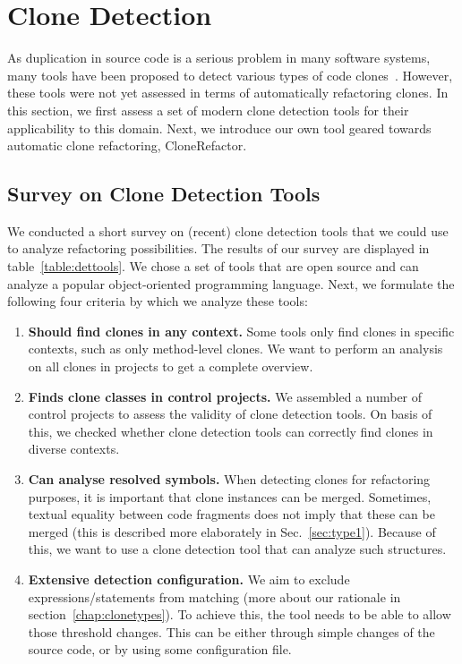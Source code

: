 \documentclass[a4paper]{article}
\begin{document}
\section{Clone Detection}\label{chap:clonedetection}
As duplication in source code is a serious problem in many software systems, many tools have been proposed to detect various types of code clones~\cite{sheneamer2016survey, svajlenko2014evaluating}. However, these tools were not yet assessed in terms of automatically refactoring clones. In this section, we first assess a set of modern clone detection tools for their applicability to this domain. Next, we introduce our own tool geared towards automatic clone refactoring, CloneRefactor.%

\subsection{Survey on Clone Detection Tools}
\label{ch:tool-overview}
We conducted a short survey on (recent) clone detection tools that we could use to analyze refactoring possibilities. The results of our survey are displayed in table~\ref{table:dettools}. We chose a set of tools that are open source and can analyze a popular object-oriented programming language. Next, we formulate the following four criteria by which we analyze these tools:
\begin{enumerate}
    \item \textbf{Should find clones in any context.} Some tools only find clones in specific contexts, such as only method-level clones. We want to perform an analysis on all clones in projects to get a complete overview.
\item \textbf{Finds clone classes in control projects.} We assembled a number of control projects to assess the validity of clone detection tools. On basis of this, we checked whether clone detection tools can correctly find clones in diverse contexts.
\item \textbf{Can analyse resolved symbols.} When detecting clones for refactoring purposes, it is important that clone instances can be merged. Sometimes, textual equality between code fragments does not imply that these can be merged (this is described more elaborately in Sec.~\ref{sec:type1}). Because of this, we want to use a clone detection tool that can analyze such structures.
\item \textbf{Extensive detection configuration.} We aim to exclude expressions/statements from matching (more about our rationale in section~\ref{chap:clonetypes}). To achieve this, the tool needs to be able to allow those threshold changes. This can be either through simple changes of the source code, or by using some configuration file.
\end{enumerate}
\end{document}
